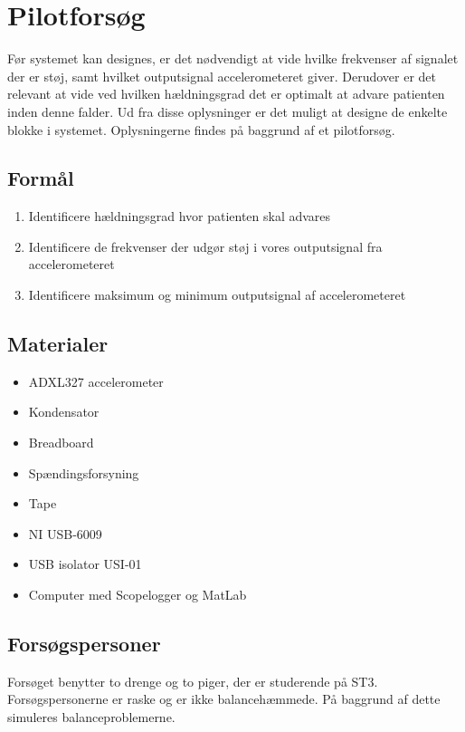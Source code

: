 \section{Pilotforsøg}
Før systemet kan designes, er det nødvendigt at vide hvilke frekvenser af signalet der er støj, samt hvilket outputsignal accelerometeret giver. Derudover er det relevant at vide ved hvilken hældningsgrad det er optimalt at advare patienten inden denne falder. Ud fra disse oplysninger er det muligt at designe de enkelte blokke i systemet. Oplysningerne findes på baggrund af et pilotforsøg. 

\subsection{Formål}
\begin{enumerate}
\item Identificere hældningsgrad hvor patienten skal advares
\item Identificere de frekvenser der udgør støj i vores outputsignal fra accelerometeret
\item Identificere maksimum og minimum outputsignal af accelerometeret
\end{enumerate}

\subsection{Materialer}
\begin{itemize}
\item ADXL327 accelerometer
\item Kondensator
\item Breadboard
\item Spændingsforsyning
\item Tape
\item NI USB-6009
\item USB isolator USI-01
\item Computer med Scopelogger og MatLab
\end{itemize}

\subsection{Forsøgspersoner}
Forsøget benytter to drenge og to piger, der er studerende på ST3. Forsøgspersonerne er raske og er ikke balancehæmmede. På baggrund af dette simuleres balanceproblemerne. 

